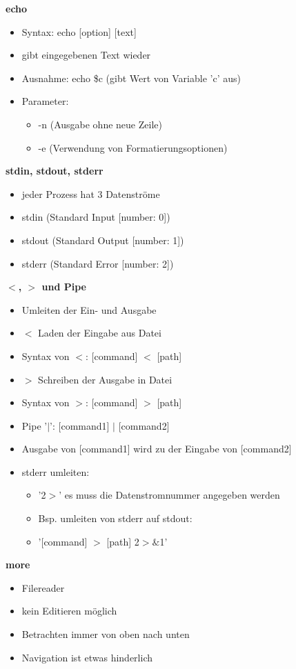 \documentclass[12pt,utf8, 10pt]{article}
\begin{document}
\textbf{echo}
\begin{itemize}
	\item Syntax: echo [option] [text]
	\item gibt eingegebenen Text wieder
	\item Ausnahme: echo \$c (gibt Wert von Variable 'c' aus)
	\item Parameter:
	\begin{itemize}
		\item -n (Ausgabe ohne neue Zeile)
		\item -e (Verwendung von Formatierungsoptionen)
	\end{itemize}
\end{itemize}

\textbf{stdin, stdout, stderr}
\begin{itemize}
	\item jeder Prozess hat 3 Datenströme
	\item stdin (Standard Input [number: 0])
	\item stdout (Standard Output [number: 1])
	\item stderr (Standard Error [number: 2])
\end{itemize}

\textbf{$<$, $>$ und Pipe}
\begin{itemize}
	\item Umleiten der Ein- und Ausgabe
	\item $<$ Laden der Eingabe aus Datei
	\item Syntax von $<$: [command] $<$ [path]
	\item $>$ Schreiben der Ausgabe in Datei
	\item Syntax von $>$: [command] $>$ [path]
	\item Pipe '$\mid$': [command1] $\mid$ [command2]
	\item Ausgabe von [command1] wird zu der Eingabe von [command2]
	\item stderr umleiten:
	\begin{itemize}
		\item '2$>$' es muss die Datenstromnummer angegeben werden
		\item Bsp. umleiten von stderr auf stdout:
		\item '[command] $>$ [path] 2$>\&$1'
	\end{itemize}	 
\end{itemize}

\textbf{more}
\begin{itemize}
	\item Filereader
	\item kein Editieren möglich
	\item Betrachten immer von oben nach unten
	\item Navigation ist etwas hinderlich
\end{itemize}
\end{document}
